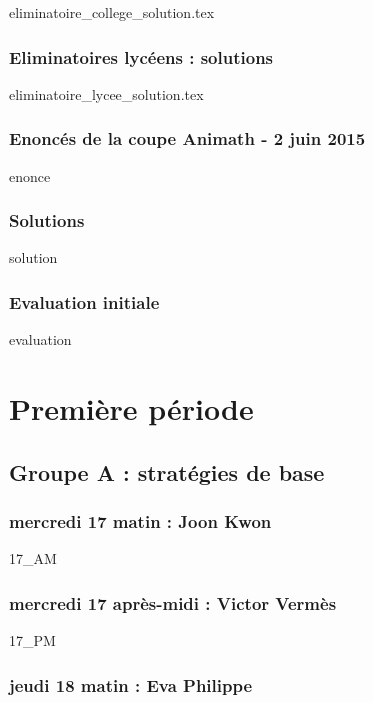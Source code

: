 \documentclass[12pt,A4]{book}
\theoremstyle{definition}
\theoremstyle{thm}
\theoremstyle{def}
\newcounter{sol}[subsection]
\newif\ifcourt
\begin{document}
{eliminatoire_college_solution.tex}

\subsection{Eliminatoires lycéens : solutions}

{eliminatoire_lycee_solution.tex}

\subsection {Enoncés de la coupe Animath - 2 juin 2015}

{enonce}

\subsection{Solutions}

{solution}

\subsection{Evaluation initiale}

{evaluation}


\ifcourt
\else
\chapter{Première période}
\minitoc \bigskip




\section {Groupe A : stratégies de base}

\subsection{mercredi 17 matin : Joon Kwon}

{17_AM}

\subsection{mercredi 17 après-midi : Victor Vermès}

{17_PM}

\subsection{jeudi 18 matin : Eva Philippe}
\end{document}
